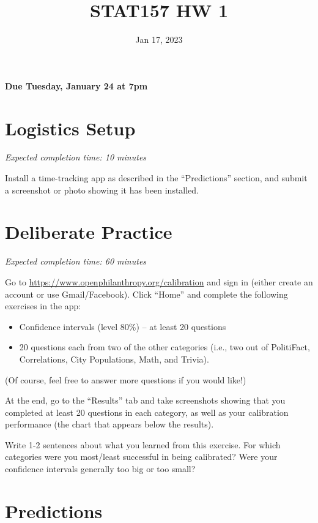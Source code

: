 \documentclass[11pt]{article}
\title{STAT157 HW 1}
\author{}
\date{Jan 17, 2023}
\begin{document}
\maketitle

\hfill \textbf{Due Tuesday, January 24 at 7pm}

\section*{Logistics Setup}

\emph{Expected completion time: 10 minutes}

Install a time-tracking app as described in the ``Predictions'' section, and submit a screenshot or photo showing it has been 
installed.

\section*{Deliberate Practice}

\emph{Expected completion time: 60 minutes}

Go to \url{https://www.openphilanthropy.org/calibration} and sign in (either create an account or use 
Gmail/Facebook). Click ``Home'' and complete the following exercises in the app:

\begin{itemize}

\item Confidence intervals (level 80\%) -- at least 20 questions
\item 20 questions each from two of the other categories (i.e., two out of PolitiFact, Correlations, City Populations, Math, and Trivia).

\end{itemize}

(Of course, feel free to answer more questions if you would like!)

At the end, go to the ``Results'' tab and take screenshots showing that 
you completed at least 20 questions in each category, as well as your calibration 
performance (the chart that appears below the results).

Write 1-2 sentences about what you learned from this exercise. For which categories were you most/least successful in being calibrated? Were your confidence intervals generally too big or too small? 

\section*{Predictions}
\end{document}

